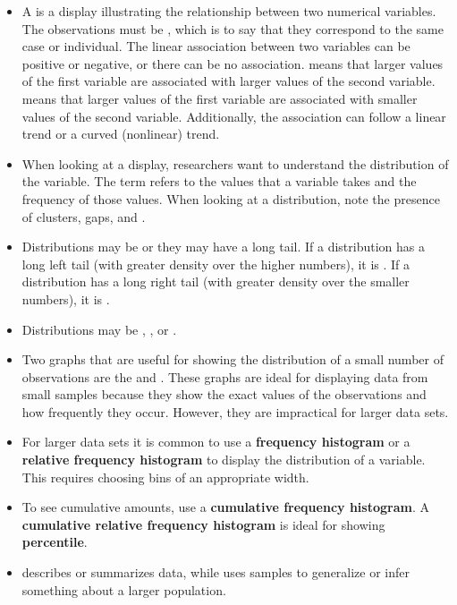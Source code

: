 \begin{itemize}
  \item A  is a  display illustrating the relationship between two numerical variables.  The observations must be , which is to say that they correspond to the same case or individual.  The linear association between two variables can be positive or negative, or there can be no association.  means that larger values of the first variable are associated with larger values of the second variable.  means that larger values of the first variable are associated with smaller values of the second variable.  Additionally, the association can follow a linear trend or a curved (nonlinear) trend.
  \item When looking at a  display, researchers want to understand the distribution of the variable.  The term  refers to the values that a variable takes and the frequency of those values.  When looking at a distribution, note the presence of clusters, gaps, and .
\item Distributions may be  or they may have a long tail.  If a distribution has a long left tail (with greater density over the higher numbers), it is . If a distribution has a long right tail (with greater density over the smaller numbers), it is .
\item Distributions may be , , or .  
\item Two graphs that are useful for showing the distribution of a small number of observations are the  and .  These graphs are ideal for displaying data from small samples because they show the exact values of the observations and how frequently they occur. However, they are impractical for larger data sets. 
\item For larger data sets it is common to use a \textbf{frequency histogram} or a \textbf{relative frequency histogram} to display the distribution of a variable.  This requires choosing bins of an appropriate width.
\item To see cumulative amounts, use a \textbf{cumulative frequency histogram}.  A \textbf{cumulative relative frequency histogram} is ideal for showing \textbf{percentile}.
\item {} describes or summarizes data, while  uses samples to generalize or infer something about a larger population.
\end{itemize}



